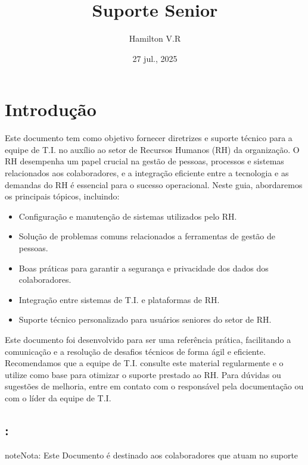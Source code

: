 \documentclass[letterpaper,10pt,portuges]{sphinxmanual}
\title{Suporte Senior}
\date{27 jul., 2025}
\author{Hamilton V.R}
\begin{document}
\pagestyle{empty}
\sphinxmaketitle
\pagestyle{plain}
\sphinxtableofcontents
\pagestyle{normal}
\label{\detokenize{index::doc}}



\chapter{Introdução}
\label{\detokenize{index:introducao}}\label{\detokenize{index:id1}}
\sphinxAtStartPar
Este documento tem como objetivo fornecer diretrizes e suporte técnico para a equipe de T.I. no auxílio ao setor de Recursos Humanos (RH) da organização. O RH desempenha um papel crucial na gestão de pessoas, processos e sistemas relacionados aos colaboradores, e a integração eficiente entre a tecnologia e as demandas do RH é essencial para o sucesso operacional.
Neste guia, abordaremos os principais tópicos, incluindo:
\begin{itemize}
\item {} 
\sphinxAtStartPar
Configuração e manutenção de sistemas utilizados pelo RH.

\item {} 
\sphinxAtStartPar
Solução de problemas comuns relacionados a ferramentas de gestão de pessoas.

\item {} 
\sphinxAtStartPar
Boas práticas para garantir a segurança e privacidade dos dados dos colaboradores.

\item {} 
\sphinxAtStartPar
Integração entre sistemas de T.I. e plataformas de RH.

\item {} 
\sphinxAtStartPar
Suporte técnico personalizado para usuários seniores do setor de RH.

\end{itemize}

\sphinxAtStartPar
Este documento foi desenvolvido para ser uma referência prática, facilitando a comunicação e a resolução de desafios técnicos de forma ágil e eficiente. Recomendamos que a equipe de T.I. consulte este material regularmente e o utilize como base para otimizar o suporte prestado ao RH.
Para dúvidas ou sugestões de melhoria, entre em contato com o responsável pela documentação ou com o líder da equipe de T.I.


\section{:}
\label{\detokenize{index:publico-alvo}}
\begin{sphinxadmonition}{note}{Nota:}
\sphinxAtStartPar
Este Documento é destinado aos colaboradores que atuam no suporte
\end{sphinxadmonition}
\end{document}
